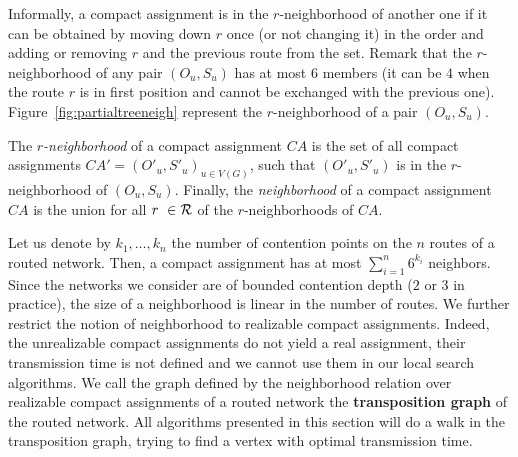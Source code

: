 Informally, a compact assignment is in the $r$-neighborhood of another one if it can be obtained by 
moving down $r$ once (or not changing it) in the order and adding or removing $r$ and the previous route from the set. 
Remark that the $r$-neighborhood of any pair $(O_u,S_u)$ has at most $6$ members (it can be $4$ when the route $r$ is in first position and cannot be exchanged with the previous one). Figure~\ref{fig:partialtreeneigh} represent the $r$-neighborhood of a pair $(O_u,S_u)$.

The \emph{$r$-neighborhood} of a compact assignment $CA$ is the set of all compact assignments $CA'=(O'_u,S'_u)_{u \in V(G)}$, such that  $(O'_u,S'_u)$ is in the $r$-neighborhood of $(O_u,S_u)$. Finally, the \emph{neighborhood} of a compact assignment $CA$ is the union for all $r \in {\cal R}$ of the $r$-neighborhoods of $CA$.  

 Let us denote by $k_1,\ldots,k_n$ the number of contention points on the $n$ routes of 
 a routed network. Then, a compact assignment has at most $\sum_{i=1}^n 6^{k_i}$ neighbors. Since the networks we consider are of bounded contention depth ($2$ or $3$ in practice), the size of a neighborhood is linear in the number of routes.  We further restrict the notion of neighborhood to realizable compact assignments. Indeed, the unrealizable compact assignments do not yield a real assignment, their transmission time is not defined and we cannot use them in our local search algorithms. We call the graph defined by the neighborhood relation over realizable compact assignments of a routed network the {\bf transposition graph} of the routed network. 
  All algorithms presented in this section will do a walk in the transposition graph, trying to find a vertex with optimal
  transmission time. 

